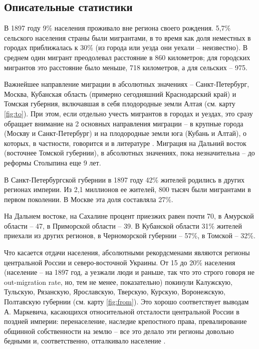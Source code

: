 \documentclass[a4paper,12pt]{article}
\begin{document}
\subsection{Описательные статистики}\label{sec:descr}

В 1897 году 9\% населения проживало вне региона своего рождения. 5,7\% сельского населения страны были мигрантами, в то время как доля неместных в городах приближалась к 30\% (из города или уезда они уехали -- неизвестно). В среднем один мигрант преодолевал расстояние в 860 километров; для городских мигрантов это расстояние было меньше, 718 километров, а для сельских -- 975.


Важнейшее направление миграции в абсолютных значениях – Санкт-Петербург, Москва, Кубанская область (примерно сегодняшний Краснодарский край) и Томская губерния, включавшая в себя плодородные земли Алтая (см. карту \ref{fig:to}). При этом, если отдельно учесть мигрантов в городах и уездах, это сразу обращает внимание на 2 основных направления миграции – в крупные города (Москву и Санкт-Петербург) и на плодородные земли юга (Кубань и Алтай), о которых, в частности, говорится и в литературе \citep{anderson_internal_1980, leasure_internal_1968}. Миграция на Дальний восток (восточнее Томской губернии), в абсолютных значениях, пока незначительна – до реформы Столыпина еще 9 лет.

В Санкт-Петербургской губернии в 1897 году 42\% жителей родились в других регионах империи. Из 2,1 миллионов ее жителей, 800 тысяч были мигрантами в первом поколении. В Москве эта доля составляла 27\%.

На Дальнем востоке, на Сахалине процент приезжих равен почти 70, в Амурской области – 47, в Приморской области – 39. В Кубанской области 31\% жителей приехали из других регионов, в Черноморской губернии – 57\%, в Томской – 32\%.

Что касается отдачи населения, абсолютными рекордсменами являются регионы центральной России и северо-восточной Украины. От 15 до 20\% населения (население – на 1897 год, а уезжали люди и раньше, так что это строго говоря не out-migration rate, но, тем не менее, показательно) покинули Калужскую, Тульскую, Рязанскую, Ярославскую, Тверскую, Курскую, Воронежскую, Полтавскую губернии (см. карту \ref{fig:from}). Это хорошо соответствует выводам А. Маркевича, касающихся относительной отсталости центральной России в поздней империи: перенаселение, наследие крепостного права, превалирование общинной собственности на землю – все это делало эти регионы довольно бедными и, соответственно, отталкивало население \citep{markevich_regional_2019}.
\end{document}
